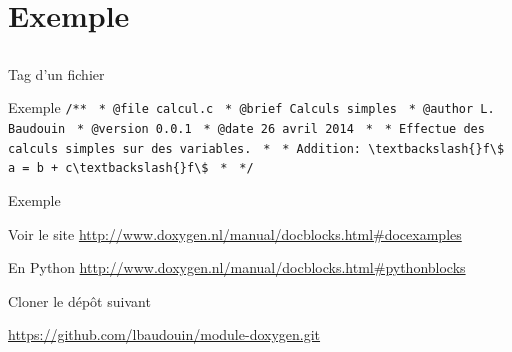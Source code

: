 \documentclass{beamer}
\begin{document}
\section{Exemple}
\subsection{}

\begin{frame}{Tag d'un fichier}
\begin{block}{Exemple}
\verb?/**?\linebreak
\verb? * @file calcul.c?\linebreak
\verb? * @brief Calculs simples?\linebreak
\verb? * @author L. Baudouin?\linebreak
\verb? * @version 0.0.1?\linebreak
\verb? * @date 26 avril 2014?\linebreak
\verb? *?\linebreak
\verb? * Effectue des calculs simples sur des variables.?\linebreak
\verb? *?\linebreak
\verb? * Addition: \textbackslash{}f\$ a = b + c\textbackslash{}f\$?\linebreak
\verb? *?\linebreak
\verb? */?
\end{block}
\end{frame}


\begin{frame}{Exemple}
\begin{exampleblock}{Voir le site}
\small
\url{http://www.doxygen.nl/manual/docblocks.html\#docexamples}
\end{exampleblock}

\begin{block}{En Python}
\small
\url{http://www.doxygen.nl/manual/docblocks.html\#pythonblocks}
\end{block}

\begin{alertblock}{Cloner le dép\^ot suivant}
\begin{small}
\url{https://github.com/lbaudouin/module-doxygen.git}
\end{small}
\end{alertblock}
\end{frame}
\end{document}
